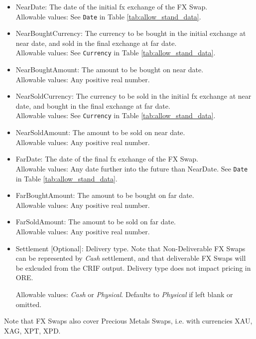 \begin{itemize}
\item NearDate: The date of the initial fx exchange of the FX Swap. \\ Allowable values:  See \lstinline!Date! in Table \ref{tab:allow_stand_data}.
\item NearBoughtCurrency: The currency to be bought in the initial exchange at near date, and sold in the final exchange at far date.  \\ Allowable values:  See \lstinline!Currency! in Table \ref{tab:allow_stand_data}.
\item NearBoughtAmount: The amount to be bought on near date.  \\ Allowable values:  Any positive real number.
\item NearSoldCurrency: The currency to be sold in the initial fx exchange at near date, and bought in the final exchange at far date.   \\ Allowable values:  See \lstinline!Currency! in Table \ref{tab:allow_stand_data}.
\item NearSoldAmount: The amount to be sold on near date.  \\ Allowable values:  Any positive real number.
\item FarDate: The date of the final fx exchange of the FX Swap. \\ Allowable values:  Any date further into the future than NearDate. See \lstinline!Date! in Table  \ref{tab:allow_stand_data}.
\item FarBoughtAmount: The amount to be bought on far date.  \\ Allowable values:  Any positive real number.
\item FarSoldAmount: The amount to be sold on far date.  \\ Allowable values:  Any positive real number.
\item Settlement [Optional]: Delivery type.  Note that Non-Deliverable FX Swaps can be represented by \emph{Cash} settlement, and that deliverable FX Swaps will be exlcuded from the CRIF output. Delivery type does not impact pricing in ORE.  

Allowable values: \emph{Cash} or \emph{Physical}.  Defaults to \emph{Physical} if left blank or omitted.

\end{itemize}

Note that FX Swaps also cover Precious Metals Swaps, i.e. with
currencies XAU, XAG, XPT, XPD.